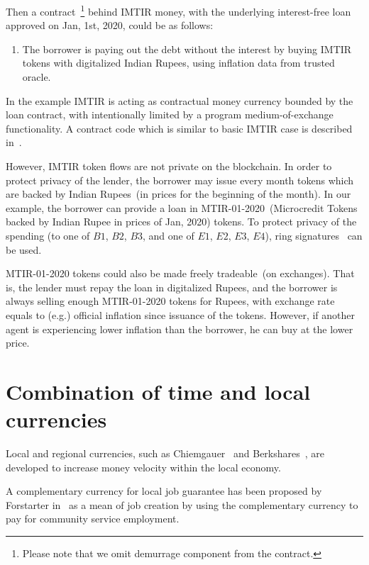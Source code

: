 \documentclass[]{llncs}   %
\begin{document}
  Then a contract~\footnote{Please note that we omit demurrage component from
 the contract.} behind IMTIR money, with the underlying interest-free loan approved on Jan, 1st, 2020,
 could be as follows:

 \begin{enumerate}
        \item{} The borrower is paying out the debt without the interest by buying IMTIR tokens with digitalized Indian 
    Rupees, using inflation data from trusted oracle.
 \end{enumerate}

 
 In the example IMTIR is acting as contractual money currency bounded by the loan contract, with intentionally limited by a
 program medium-of-exchange functionality. A contract code which is similar to basic IMTIR case is described in~\cite{scpeople}.

 However, IMTIR token flows are not private on the blockchain. In order to protect privacy of the lender, the borrower
 may issue every month tokens which are backed by Indian Rupees~(in prices for the beginning of the month). In our example, the
 borrower can provide a loan in MTIR-01-2020~(Microcredit Tokens backed by Indian Rupee in prices of
 Jan, 2020) tokens. To protect privacy of the spending (to one of $B1$, $B2$, $B3$, and one of $E1$, $E2$, $E3$, $E4$), ring
 signatures~\cite{rivest2001leak} can be used.

 MTIR-01-2020 tokens could also be made freely tradeable~(on exchanges). That is, the lender must repay the loan in
 digitalized Rupees, and the borrower is always selling enough MTIR-01-2020 tokens for Rupees, with exchange rate equals
 to (e.g.) official inflation since issuance of the tokens. However, if another agent is experiencing lower inflation
 than the borrower, he can buy at the lower price.

\section{Combination of time and local currencies}
\label{sec-combination}

Local and regional currencies, such as Chiemgauer~\cite{???} and Berkshares~\cite{???}, are developed to increase money velocity within the local economy.

A complementary currency for local job guarantee has been proposed by Forstarter in~\cite{forstater2018complementary} as a mean
of job creation by using the complementary currency to pay for community service employment.
\end{document}
